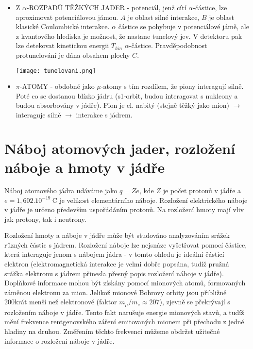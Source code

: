 \documentclass[../../main.tex]{subfiles}
\begin{document}
\begin{itemize}
\begin{itemize}
		\item Z $\alpha$-ROZPADŮ TĚŽKÝCH JADER - potenciál, jenž cítí $\alpha$-částice, lze aproximovat potenciálovou jámou. $A$ je oblast silné interakce, $B$ je oblast klasické Coulombické interakce. $\alpha$ částice se pohybuje v potenciálové jámě, ale z kvantového hlediska je možnost, že nastane tunelový jev. V detektoru pak lze detekovat kinetickou energii $T_{kin}$ $\alpha$-částice. Pravděpodobnost protunelování je dána obsahem plochy $C$. 
		
		\begin{center}
			\texttt{[image: tunelovani.png]}
		\end{center}
		
		\item $\pi$-ATOMY - obdobné jako $\mu$-atomy s tím rozdílem, že piony interagují silně. Poté co se dostanou blízko jádru (s1-orbit, budou interagovat s nukleony a budou absorbovány v jádře). Pion je el. nabitý (stejně těžký jako mion) $\rightarrow$ interaguje silně $\rightarrow$ interakce s jádrem.
	\end{itemize}
\end{itemize}


\section{Náboj atomových jader, rozložení náboje a hmoty v jádře}

Náboj atomového jádra udáváme jako $q = Z e$, kde $Z$ je počet protonů v jádře a $e = 1,602.10^{-19} ~\mathrm{C}$ je velikost elementárního náboje. Rozložení elektrického náboje v jádře je určeno především uspořádáním protonů. Na rozložení hmoty mají vliv jak protony, tak i neutrony. 

Rozložení hmoty a náboje v jádře může být studováno analyzováním srážek různých částic s jádrem. Rozložení náboje lze nejsnáze vyšetřovat pomocí částice, která interaguje jenom s nábojem jádra - v tomto ohledu je ideální částicí elektron (elektromagnetická interakce je velmi dobře popsána, tudíž pružná srážka elektronu s jádrem přinesla přesný popis rozložení náboje v jádře). Doplňkové informace mohou být získány pomocí mionových atomů, formovaných záměnou elektronu za mion. Jelikož mionové Bohrovy orbity jsou přibližně 200krát menší než elektronové (faktor $m_{\mu} /m_e \approx 207$), zjevně se překrývají s rozložením náboje v jádře. Tento fakt narušuje energie mionových stavů, a tudíž mění frekvence rentgenovského záření emitovaných mionem při přechodu z jedné hladiny na druhou. Změřením těchto frekvencí můžeme obdržet užitečné informace o rozložení náboje v jádře.
\end{document}

